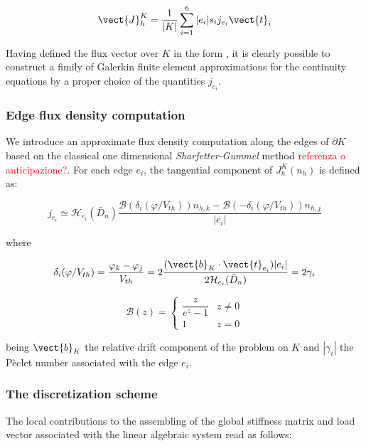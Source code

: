 \begin{equation}
\label{eq: exp fitted flux}
\vect{J}_h^K = \dfrac{1}{|K|}\sum_{i=1}^6 |e_i| s_i j_{e_i} \vect{t}_i 
\end{equation}

Having defined the flux vector over $K$ in the form , it is clearly possible to construct a fimily of Galerkin finite element approximations for the continuity equations by a proper choice of the quantities $j_{e_i}$. 

\subsubsection{Edge flux density computation}

We introduce an approximate flux density computation along the edges of $\partial K$ based on the classical one dimensional \textit{Sharfetter-Gummel} method \textcolor{red}{referenza o anticipazione?}. For each edge $e_i$, the tangential component of $J_h^K(n_h)$ is defined as:

\begin{equation}
j_{e_i}  \simeq \mathcal{H}_{e_i}(\bar{D}_n) \dfrac{\mathcal{B}(\delta_i(\varphi / V_{th}))n_{h,k} -  \mathcal{B}(-\delta_i(\varphi / V_{th}))n_{h,j}}{|e_i|}
\end{equation}

where 

\begin{equation}
\delta_i(\varphi / V_{th}) = \dfrac{\varphi_k - \varphi_j}{V_{th}} = 2 \dfrac{(\vect{b}_K\cdot \vect{t}_{e_i}) |e_i|}{2\mathcal{H}_{e_i}(\bar{D}_n) } = 2 \gamma_i
\end{equation}

\begin{equation}
\mathcal{B}(z) = \left\{ \begin{array}{cl}
\dfrac{z}{e^z-1} & z \neq 0
\\
1 & z = 0
\end{array}
\right.
\end{equation}

being $\vect{b}_K$ the relative drift component of the problem on $K$ and $|\gamma_i|$ the P\`eclet number associated with the edge $e_i$.  

\subsubsection{The discretization scheme}

The local contributions to the assembling of the global stiffness matrix and load vector associated with the linear algebraic system read as follows:

